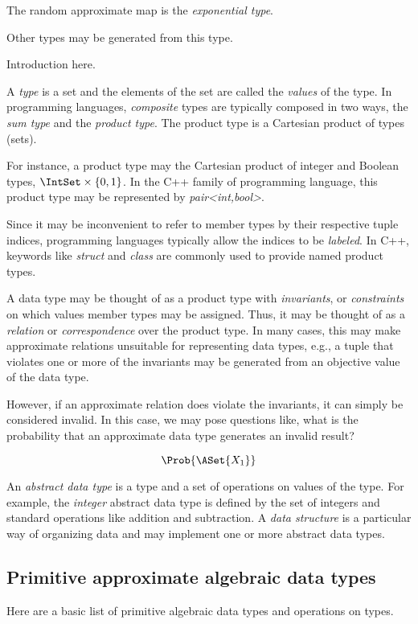 \documentclass[ ../main.tex]{subfiles}
\begin{document}
The random approximate map is the \emph{exponential type}.

Other types may be generated from this type.


Introduction here.


A \emph{type} is a set and the elements of the set are called the \emph{values} 
of the type. In programming languages, \emph{composite} types are typically composed in two ways, the \emph{sum type} and the \emph{product type}. The product type is a Cartesian product of types (sets).

For instance, a product type may the Cartesian product of integer and Boolean types, $\IntSet \times \{0,1\}$. In the C++ family of programming language, this product type may be represented by \emph{pair<int,bool>}.

Since it may be inconvenient to refer to member types by their respective tuple indices, programming languages typically allow the indices to be \emph{labeled}. In C++, keywords like \emph{struct} and \emph{class} are commonly used to provide named product types.

A data type may be thought of as a product type with \emph{invariants}, or \emph{constraints} on which values member types may be assigned. Thus, it may be thought of as a \emph{relation} or \emph{correspondence} over the product type. In many cases, this may make approximate relations unsuitable for representing data types, e.g., a tuple that violates one or more of the invariants may be generated from an objective value of the data type.

However, if an approximate relation does violate the invariants, it can simply be considered invalid. In this case, we may pose questions like, what is the probability that an approximate data type generates an invalid result?

\begin{equation}
\Prob{\ASet{X_1}}
\end{equation}



An \emph{abstract data type} is a type and a set of operations on values of the type. For example, the \emph{integer} abstract data type is defined by the set of integers and standard operations like addition and subtraction.
A \emph{data structure} is a particular way of organizing data and 
may implement one or more abstract data types.

\subsection{Primitive approximate algebraic data types}
Here are a basic list of primitive algebraic data types and operations on types.
\end{document}
